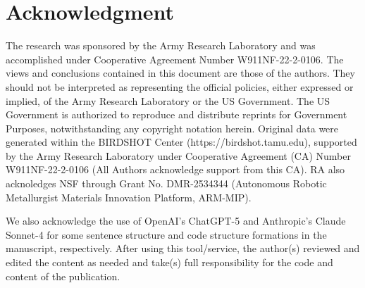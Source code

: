 \section{Acknowledgment}
The research was sponsored by the Army Research Laboratory and was accomplished under Cooperative Agreement Number W911NF-22-2-0106. The views and conclusions contained in this document are those of the authors. They should not be interpreted as representing the official policies, either expressed or implied, of the Army Research Laboratory or the US Government. The US Government is authorized to reproduce and distribute reprints for Government Purposes, notwithstanding any copyright notation herein. Original data were generated within the BIRDSHOT Center (https://birdshot.tamu.edu), supported by the Army Research Laboratory under Cooperative Agreement (CA) Number W911NF-22-2-0106 (All Authors acknowledge support from this CA). RA also acknoledges NSF through Grant No. DMR-2534344 (Autonomous Robotic Metallurgist Materials Innovation Platform, ARM-MIP).

We also acknowledge the use of OpenAI's ChatGPT-5 and Anthropic's Claude Sonnet-4 for some sentence structure and code structure formations in the manuscript, respectively. After using this tool/service, the author(s) reviewed and edited the content as needed and take(s) full responsibility for the code and content of the publication. 